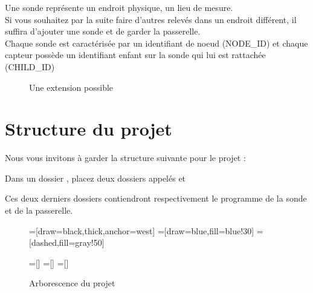   Une sonde représente un endroit physique, un lieu de mesure. \\
  Si vous souhaitez par la suite faire d'autres relevés dans un endroit différent, il suffira d'ajouter une sonde et de garder la passerelle.\\
  Chaque sonde est caractérisée par un identifiant de noeud (NODE\_ID) et chaque capteur possède un identifiant enfant sur la sonde qui lui est rattachée (CHILD\_ID)
  \begin{figure}[h]
    \centering
    \caption{Une extension possible}
  \end{figure}





  \section{Structure du projet}

  Nous vous invitons à garder la structure suivante pour le projet : 
  
  Dans un dossier , placez deux dossiers appelés  et 
  
  Ces deux derniers dossiers contiendront respectivement le programme de la sonde et de la passerelle.
  
  
  \begin{figure}[h!]
    \centering
  \usetikzlibrary{trees}
  
  =[draw=black,thick,anchor=west]
  =[draw=blue,fill=blue!30]
  =[dashed,fill=gray!50]
  
  =[]
  =[]
  =[]
  \caption{Arborescence du projet}
  \end{figure}